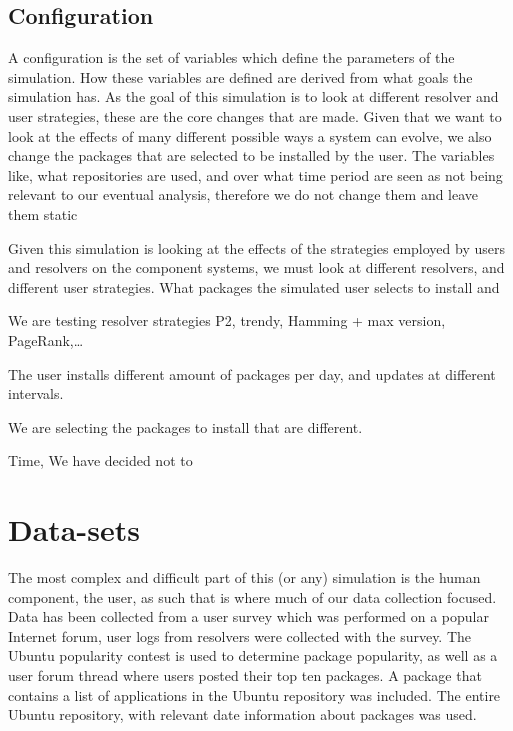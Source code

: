 \subsection{Configuration}
A configuration is the set of variables which define the parameters of the simulation.
How these variables are defined are derived from what goals the simulation has.
As the goal of this simulation is to look at different resolver and user strategies,
these are the core changes that are made.
Given that we want to look at the effects of many different possible ways a system can evolve,
we also change the packages that are selected to be installed by the user.
The variables like, what repositories are used, and over what time period are seen as not being relevant to our eventual analysis,
therefore we do not change them and leave them static

Given this simulation is looking at the effects of the strategies employed by users and resolvers on the component systems,
we must look at different resolvers, and different user strategies.
What packages the simulated user selects to install and 

We are testing resolver strategies P2, trendy, Hamming + max version, PageRank,\ldots 

The user installs different amount of packages per day, and updates at different intervals. 

We are selecting the packages to install that are different.

Time, We have decided not to 

\section{Data-sets}
The most complex and difficult part of this (or any) simulation is the human component, the user,
as such that is where much of our data collection focused.
Data has been collected from
a user survey which was performed on a popular Internet forum,
user logs from resolvers were collected with the survey.
The Ubuntu popularity contest is used to determine package popularity,
as well as a user forum thread where users posted their top ten packages.
A package that contains a list of applications in the Ubuntu repository was included.
The entire Ubuntu repository, with relevant date information about packages was used.


